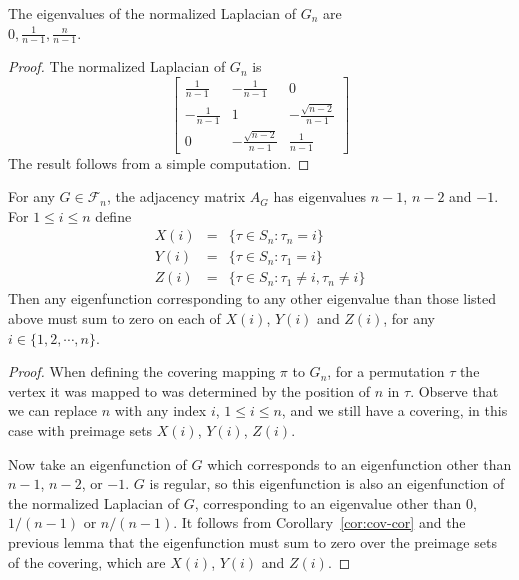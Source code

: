 \begin{lemma}
\label{g_eigen}
The eigenvalues of the normalized Laplacian  of $G_n$ are \\$0, \frac 1{n-1}, \frac n {n-1}$.  
\end{lemma}
\begin{proof}
The normalized Laplacian of $G_n$ is
                              \[ \left[ \begin{array}{ccc}  \frac 1 {n-1} &- \frac 1 {n-1} & 0\\
                             - \frac 1 {n-1} &1 &- \frac{\sqrt{n-2}}{n-1} \\
                             0 &  -\frac{\sqrt{n-2}}{n-1} &  \frac 1 {n-1}
                              \end{array} \right] \]
 The result follows from a simple computation.
\end{proof}

\begin{corollary}\label{cor:adj_spec}
For any $G \in \mathcal{F}_n$, the adjacency matrix $A_{G}$ has eigenvalues $n-1$, $n-2$ and $-1$.
For $1 \leq i \leq n$ define
\begin{eqnarray*}
 X(i) & = & \{\tau \in S_n : \tau_n = i \} \\
 Y(i) & = & \{\tau \in S_n : \tau_1 = i \} \\
 Z(i) & = & \{\tau \in S_n : \tau_1 \neq i, \tau_n \neq i \}  
\end{eqnarray*}
Then any eigenfunction corresponding to any other eigenvalue than those listed above must sum to zero on
each of $X(i)$, $Y(i)$ and $Z(i)$, for any $i \in \{1,2,\cdots,n\}$.
\end{corollary}
\begin{proof}
  When defining the covering mapping $\pi$ to $G_n$, for
  a permutation $\tau$ the vertex it was mapped to was
  determined by the position of $n$ in $\tau$. 
  Observe that we can replace $n$ with any index $i$, $1 \leq i \leq n$, and
  we still have a covering, in this case with preimage sets $X(i)$, $Y(i)$, $Z(i)$.


  Now take an eigenfunction of $G$ which corresponds to an eigenfunction other than
  $n-1$, $n-2$, or $-1$.  $G$ is regular, so this eigenfunction is also an
  eigenfunction of the normalized Laplacian of $G$, corresponding to an eigenvalue
  other than $0$, $1/(n-1)$ or $n/(n-1)$.  It follows from Corollary~\ref{cor:cov-cor}
  and the previous lemma that the eigenfunction must sum to zero over the preimage
  sets of the covering, which are $X(i)$, $Y(i)$ and $Z(i)$.    
\end{proof}

